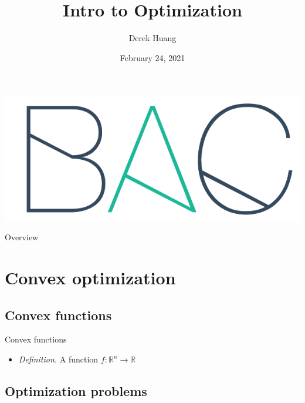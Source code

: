 \documentclass{beamer}
\title[Intro to Optimization]{Intro to Optimization}
\author[Derek Huang (BAC Advanced Team)]{Derek Huang}
\institute{BAC Advanced Team}
\date{February 24, 2021}
\numberwithin{equation}{section}
\begin{document}
\begin{frame}
    \titlepage
    \centering
    \includegraphics[scale = 0.1]{../bac_logo1.png}
\end{frame}

\begin{frame}{Overview}
    \tableofcontents
\end{frame}

\section{Convex optimization}

\subsection{Convex functions}

\begin{frame}{Convex functions}
    \begin{itemize}
        \item
        \textit{Definition.} A function $ f : \mathbb{R}^n \rightarrow \mathbb{R} $
    \end{itemize}
\end{frame}

\subsection{Optimization problems}
\end{document}
